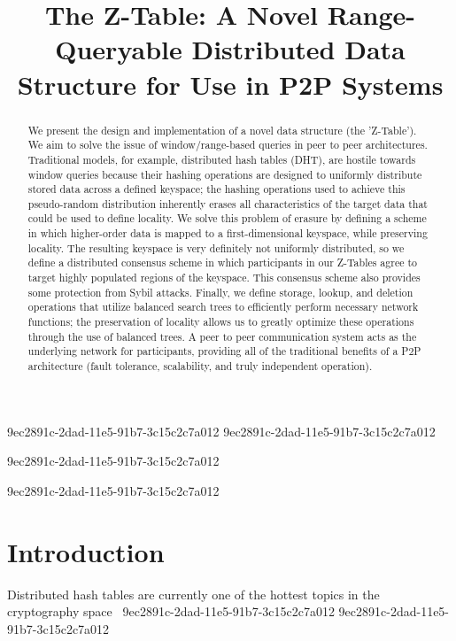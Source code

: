 \documentclass[12pt]{article}
\title{The Z-Table: A Novel Range-Queryable Distributed Data Structure for Use in P2P Systems}
\begin{document}
9ec2891c-2dad-11e5-91b7-3c15c2c7a012
9ec2891c-2dad-11e5-91b7-3c15c2c7a012\maketitle

\begin{abstract}
We present the design and implementation of a novel data structure (the 'Z-Table'). We aim to solve the issue of window/range-based queries in peer to peer architectures. Traditional models, for example,  distributed hash tables (DHT), are hostile towards window queries because their hashing operations are designed to uniformly distribute stored data across a defined keyspace; the hashing operations used to achieve this pseudo-random distribution inherently erases all characteristics of the target data that could be used to define locality. We solve this problem of erasure by defining a scheme in which higher-order data is mapped to a first-dimensional keyspace, while preserving locality. The resulting keyspace is very definitely not uniformly distributed, so we define a distributed consensus scheme in which participants in our Z-Tables agree to target highly populated regions of the keyspace. This consensus scheme also provides some protection from Sybil attacks. Finally, we define storage, lookup, and deletion operations that utilize balanced search trees to efficiently perform necessary network functions; the preservation of locality allows us to greatly optimize these operations through the use of balanced trees. A peer to peer communication system acts as the underlying network for participants, providing all of the traditional benefits of a P2P architecture (fault tolerance, scalability, and truly independent operation).
\end{abstract}
9ec2891c-2dad-11e5-91b7-3c15c2c7a012

\newpage
9ec2891c-2dad-11e5-91b7-3c15c2c7a012\section{Introduction}
Distributed hash tables are currently one of the hottest topics in the cryptography space~\cite{Stoica:2001dj,Rowstron:2001ea,Ratnasamy:2001wn}
9ec2891c-2dad-11e5-91b7-3c15c2c7a012
\printbibliography
9ec2891c-2dad-11e5-91b7-3c15c2c7a012
\end{document}
